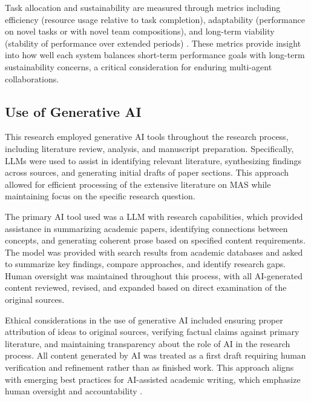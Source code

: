 \documentclass[a4paper, 12pt]{article}
\begin{document}
Task allocation and sustainability are measured through metrics including efficiency (resource usage relative to task completion), adaptability (performance on novel tasks or with novel team compositions), and long-term viability (stability of performance over extended periods) \autocite{Shu2024, Chen2024}. These metrics provide insight into how well each system balances short-term performance goals with long-term sustainability concerns, a critical consideration for enduring multi-agent collaborations.

\subsection{Use of Generative AI}

This research employed generative AI tools throughout the research process, including literature review, analysis, and manuscript preparation. Specifically, LLMs were used to assist in identifying relevant literature, synthesizing findings across \linebreak sources, and generating initial drafts of paper sections. This approach allowed for efficient processing of the extensive literature on MAS while maintaining focus on the specific research question.

The primary AI tool used was a LLM with research capabilities, which provided assistance in summarizing academic papers, identifying connections between concepts, and generating coherent prose based on specified content requirements. The model was provided with search results from academic databases and asked to summarize key findings, compare approaches, and identify research gaps. Human oversight was maintained throughout this process, with all AI-generated content reviewed, revised, and expanded based on direct examination of the original sources.

Ethical considerations in the use of generative AI included ensuring proper attribution of ideas to original sources, verifying factual claims against primary literature, and maintaining transparency about the role of AI in the research process. All content generated by AI was treated as a first draft requiring human verification and refinement rather than as finished work. This approach aligns with emerging best practices for AI-assisted academic writing, which emphasize human oversight and accountability \autocite{Lund2023}.
\end{document}
